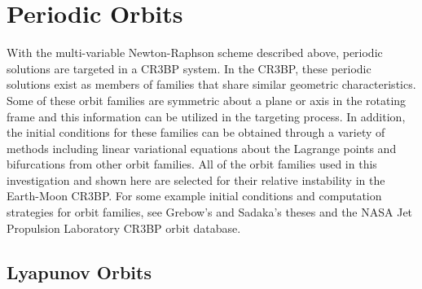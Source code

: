 \section{Periodic Orbits}
With the multi-variable Newton-Raphson scheme described above, periodic solutions are targeted in a
CR3BP system. In the CR3BP, these periodic solutions exist as members of families that share
similar geometric characteristics. Some of these orbit families are symmetric about a plane or axis
in the rotating frame and this information can be utilized in the targeting process. In addition,
the initial conditions for these families can be obtained through a variety of methods including
linear variational equations about the Lagrange points and bifurcations from other orbit families.
All of the orbit families used in this investigation and shown here are selected for their relative
instability in the Earth-Moon CR3BP. For some example initial conditions and computation strategies
for orbit families, see Grebow's\cite{Grebow:2006} and Sadaka's\cite{Sadaka:2023} theses and the
NASA Jet Propulsion Laboratory CR3BP orbit database\cite{Park}.

\subsection{Lyapunov Orbits}
